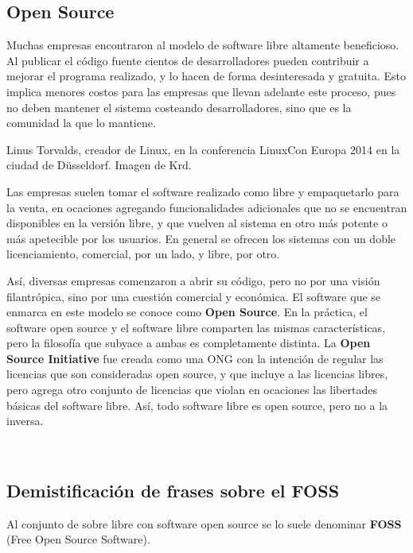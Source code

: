 \subsection{Open Source}
\label{chap:informatica:subsec:open_source}

Muchas empresas encontraron al modelo de software libre altamente beneficioso.
Al publicar el código fuente cientos de desarrolladores pueden contribuir a
mejorar el programa realizado, y lo hacen de forma desinteresada y gratuita.
Esto implica menores costos para las empresas que llevan adelante este proceso,
pues no deben mantener el sistema costeando desarrolladores, sino que es la
comunidad la que lo mantiene.

{Linus Torvalds, creador de Linux, en la conferencia LinuxCon Europa 2014 en la
ciudad de Düsseldorf.} {Imagen de Krd.}

Las empresas suelen tomar el software realizado como libre y empaquetarlo para
la venta, en ocaciones agregando funcionalidades adicionales que no se
encuentran disponibles en la versión libre, y que vuelven al sistema en otro más
potente o más apetecible por los usuarios. En general se ofrecen los sistemas
con un doble licenciamiento, comercial, por un lado, y libre, por otro.

Así, diversas empresas comenzaron a abrir su código, pero no por una visión
filantrópica, sino por una cuestión comercial y económica. El software que se
enmarca en este modelo se conoce como \textbf{Open Source}. En la práctica, el
software open source y el software libre comparten las mismas características,
pero la filosofía que subyace a ambas es completamente distinta. La \textbf{Open
Source Initiative} fue creada como una ONG con la intención de regular las
licencias que son consideradas open source, y que incluye a las licencias
libres, pero agrega otro conjunto de licencias que violan en ocaciones las
libertades básicas del software libre. Así, todo software libre es open source,
pero no a la inversa.

~


\subsection{Demistificación de frases sobre el FOSS}
\label{chap:informatica:subsec:foss}

Al conjunto de sobre libre con software open source se lo suele denominar
\textbf{FOSS} (Free Open Source Software).

